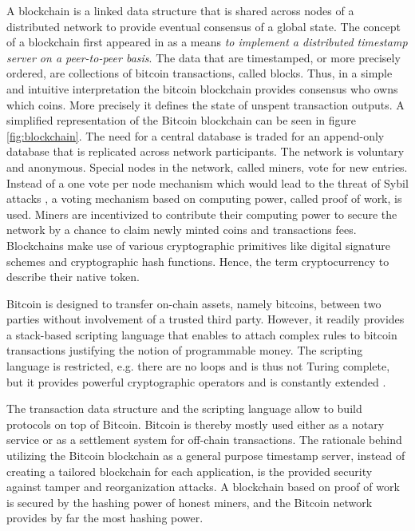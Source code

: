 \documentclass[10pt, conference,compsoc]{IEEEtran}
\begin{document}
  A blockchain is a linked data structure that is shared across nodes of a distributed network to provide eventual consensus of a global state. The concept of a blockchain first appeared in \cite{nakamoto2008bitcoin} as a means \textit{to implement  a distributed timestamp server on a peer-to-peer basis}. The data that are timestamped, or more precisely ordered, are collections of bitcoin transactions, called blocks. Thus, in a simple and intuitive interpretation the bitcoin blockchain provides consensus who owns which coins. More precisely it defines the state of unspent transaction outputs. A simplified representation of the Bitcoin blockchain can be seen in figure \ref{fig:blockchain}. The need for a central database is traded for an append-only database that is replicated across network participants. The network is voluntary and anonymous. Special nodes in the network, called miners, vote for new entries. Instead of a one vote per node mechanism which would lead to the threat of Sybil attacks \cite{douceur2002sybil}, a voting mechanism based on computing power, called proof of work, is used. Miners are incentivized to contribute their computing power to secure the network by a chance to claim newly minted coins and transactions fees. Blockchains make use of various cryptographic primitives like digital signature schemes and cryptographic hash functions. Hence, the term cryptocurrency to describe their native token.

  Bitcoin is designed to transfer on-chain assets, namely bitcoins, between two parties without involvement of a trusted third party. However, it readily provides a stack-based scripting language that enables to attach complex rules to bitcoin transactions justifying the notion of programmable money. The scripting language is restricted, e.g. there are no loops and is thus not Turing complete, but it provides powerful cryptographic operators and is constantly extended \cite{bips}.

  The transaction data structure and the scripting language allow to build protocols on top of Bitcoin. Bitcoin is thereby mostly used either as a notary service or as a settlement system for off-chain transactions. The rationale behind utilizing the Bitcoin blockchain as a general purpose timestamp server, instead of creating a tailored blockchain for each application, is the provided security against tamper and reorganization attacks. A blockchain based on proof of work is secured by the hashing power of honest miners, and the Bitcoin network provides by far the most hashing power.
\end{document}
